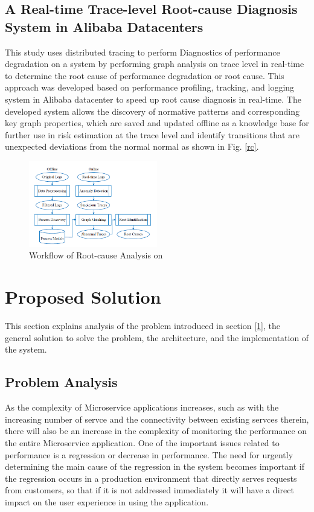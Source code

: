 \documentclass[conference]{configs/IEEEtran}
\begin{document}
\subsection{A Real-time Trace-level Root-cause Diagnosis System in Alibaba Datacenters}
This study \cite{rca-alibaba} uses distributed tracing to perform
Diagnostics of performance degradation on a system by performing graph analysis on
trace level in real-time to determine the root cause of performance degradation or
root cause. This approach was developed based on performance profiling, tracking, and logging system in Alibaba datacenter to speed up root cause diagnosis in real-time. The developed system allows the discovery of normative patterns and corresponding key graph properties, which are saved and updated offline as a knowledge base for further use in risk estimation at the trace level and identify transitions that are unexpected deviations from the normal
normal as shown in Fig. \ref{rc}.
\begin{figure}[htb]
	\centering
	\includegraphics[width=0.5\textwidth]{resources/ch2/rca-framework.png}
	\caption{Workflow of Root-cause Analysis on \cite{rca-alibaba}}
	\label{rca-framwork}
\end{figure}

\section{Proposed Solution}
This section explains analysis of the problem introduced in section \ref{1}, the general solution to solve the problem, the architecture, and the implementation of the system.

\subsection{Problem Analysis}
As the complexity of Microservice applications increases, such as with the increasing number of servce and the connectivity between existing servces therein, there will also be an increase in the complexity of monitoring the performance on the entire Microservice application. One of the important issues related to performance is a regression or decrease in performance. The need for urgently determining the main cause of the regression in the system becomes important if the regression occurs in a production environment that directly serves requests from customers, so that if it is not addressed immediately it will have a direct impact on the
user experience in using the application.
\end{document}
